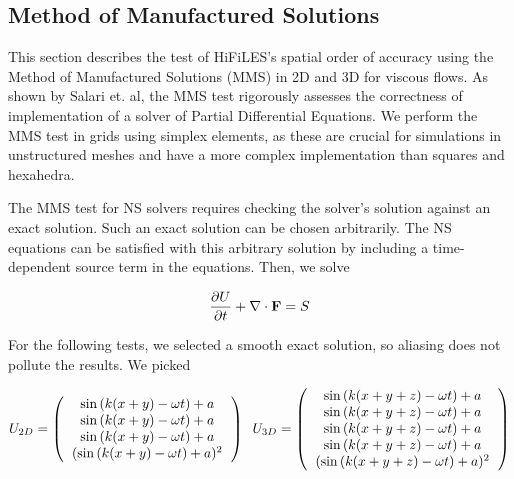 \graphicspath{{figures_manufactured/}}%


\subsection{Method of Manufactured Solutions}

This section describes the test of HiFiLES's spatial order of accuracy using the Method of Manufactured Solutions (MMS) in 2D and 3D for viscous flows. As shown by Salari et. al\cite{salari2000code}, the MMS test rigorously assesses the correctness of implementation of a solver of Partial Differential Equations. We perform the MMS test in grids using simplex elements, as these are crucial for simulations in unstructured meshes and have a more complex implementation than squares and hexahedra.

The MMS test for NS solvers requires checking the solver's solution against an exact solution. Such an exact solution can be chosen arbitrarily. The NS equations can be satisfied with this arbitrary solution by including a time-dependent source term in the equations. Then, we solve

\begin{equation}
\frac{\partial U}{\partial t} +  \nabla \cdot {\bf F} = S
\end{equation}

For the following tests, we selected a smooth exact solution, so aliasing does not pollute the results. We picked

\begin{equation}\label{eq:NSwithSource}
U_{2D} = \l(
\begin{tabular}{c}
$\sin{(k(x+y) - \omega t)} + a$\\
$\sin{(k(x+y) - \omega t)} + a$\\
$\sin{(k(x+y) - \omega t)} + a$\\
$(\sin{(k(x+y) - \omega t)} + a)^2$
\end{tabular}
\r) \;\; 
U_{3D} = \l(
\begin{tabular}{c}
$\sin{(k(x+y+z) - \omega t)} + a$\\
$\sin{(k(x+y+z) - \omega t)} + a$\\
$\sin{(k(x+y+z) - \omega t)} + a$\\
$\sin{(k(x+y+z) - \omega t)} + a$\\
$(\sin{(k(x+y+z) - \omega t)} + a)^2$
\end{tabular}
\r)
\end{equation}

